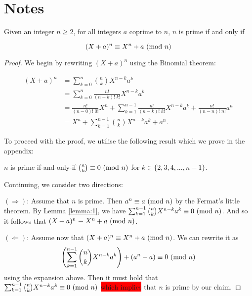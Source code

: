 \section{Notes}

\begin{theorem} \label{theorem:1}
Given an integer $n \geq 2$, for all integers $a$ coprime to $n$, $n$ is prime if and only if

\begin{equation}
    (X + a)^{n} \equiv X^{n} + a \ (\mathrm{mod}\ n)
\end{equation}

\end{theorem}

\begin{proof}

We begin by rewriting $(X + a)^{n}$ using the Binomial theorem:

\begin{equation*}
    \begin{split}
        (X + a)^{n} &= \sum_{k=0}^{n} \binom{n}{k} X^{n-k} a^{k} \\
        &= \sum_{k=0}^{n} \frac{n!}{(n-k)!\;k!} X^{n-k} a^{k} \\
        &= \frac{n!}{(n-0)!\;0!} X^{n} + \sum_{k=1}^{n-1} \frac{n!}{(n-k)!\;k!} X^{n-k} a^{k} + \frac{n!}{(n-n)!\;n!} a^{n} \\
        &= X^{n} + \sum_{k=1}^{n-1} \binom{n}{k} X^{n-k} a^{k} + a^{n}.
    \end{split}
\end{equation*}

To proceed with the proof, we utilise the following result which we prove in the appendix:

\begin{lemma} \label{lemma:1}
    $n$ is prime if-and-only-if $\binom{n}{k} \equiv 0 \ (\mathrm{mod}\ n)$ for $k \in \{ 2,3,4,...,n-1 \}$.
\end{lemma}

Continuing, we consider two directions:

$(\Longrightarrow)$: Assume that $n$ is prime. Then $a^{n} \equiv a \ (\mathrm{mod}\ n)$ by the Fermat's little theorem. By Lemma \ref{lemma:1}, we have $\sum_{k=1}^{n-1} \binom{n}{k} X^{n-k} a^{k} \equiv 0 \ (\mathrm{mod}\ n)$. And so it follows that $(X + a)^{n} \equiv X^{n} + a \ (\mathrm{mod}\ n)$.
\newline

$(\Longleftarrow)$: Assume now that $(X + a)^{n} \equiv X^{n} + a \ (\mathrm{mod}\ n)$. We can rewrite it as $$ \Biggl( \sum_{k=1}^{n-1} \binom{n}{k} X^{n-k} a^{k} \Biggr) + (a^{n} - a) \equiv 0 \ (\mathrm{mod}\ n) $$ using the expansion above. Then it must hold that $\sum_{k=1}^{n-1} \binom{n}{k} X^{n-k} a^{k} \equiv 0 \ (\mathrm{mod}\ n)$ \colorbox{red}{which implies} that $n$ is prime by our claim.



\end{proof}
